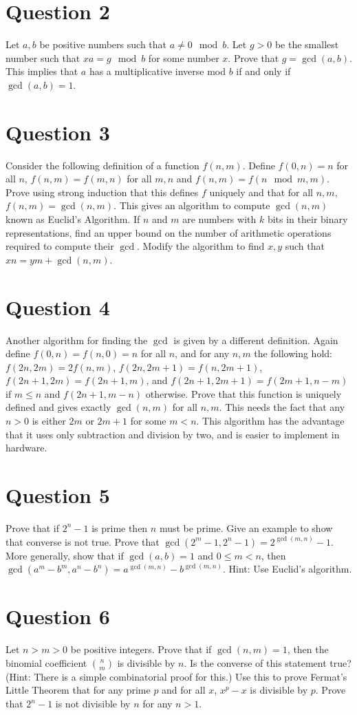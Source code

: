 \documentclass[12pt]{report}
\begin{document}
\section*{Question 2}
Let $a, b$ be positive numbers such that $a \neq 0 \mod b$. Let $g > 0$ be the smallest number such that $xa = g \mod b$ for some number $x$. Prove that $g = \gcd(a, b)$. This implies that $a$ has a multiplicative inverse mod $b$ if and only if $\gcd(a, b) = 1$.
\section*{Question 3}
Consider the following definition of a function $f(n, m)$. Define $f(0, n) = n$ for all $n$, $f(n, m) = f(m, n)$ for all $m, n$ and $f(n, m) = f(n \mod m, m)$. Prove using strong induction that this defines $f$ uniquely and that for all $n, m$, $f(n, m) = \gcd(n, m)$. This gives an algorithm to compute $\gcd(n, m)$ known as Euclid's Algorithm. If $n$ and $m$ are numbers with $k$ bits in their binary representations, find an upper bound on the number of arithmetic operations required to compute their $\gcd$. Modify the algorithm to find $x, y$ such that $xn = ym + \gcd(n, m)$.
\section*{Question 4}
Another algorithm for finding the $\gcd$ is given by a different definition. Again define $f(0, n) = f(n, 0) = n$ for all $n$, and for any $n, m$ the following hold: $f(2n, 2m) = 2f(n, m)$, $f(2n, 2m + 1) = f(n, 2m + 1)$, $f(2n + 1, 2m) = f(2n + 1, m)$, and $f(2n + 1, 2m + 1) = f(2m + 1, n - m)$ if $m \leq n$ and $f(2n + 1, m - n)$ otherwise. Prove that this function is uniquely defined and gives exactly $\gcd(n, m)$ for all $n, m$. This needs the fact that any $n > 0$ is either $2m$ or $2m + 1$ for some $m < n$. This algorithm has the advantage that it uses only subtraction and division by two, and is easier to implement in hardware.
\section*{Question 5}
Prove that if $2^{n} - 1$ is prime then $n$ must be prime. Give an example to show that converse is not true. Prove that $\gcd(2^{m} - 1, 2^{n} - 1) = 2^{\gcd(m, n)} - 1$. More generally, show that if $\gcd(a, b) = 1$ and $0 \leq m < n$, then $\gcd(a^m - b^m, a^n - b^n) = a^{\gcd(m, n)} - b^{\gcd(m, n)}$. Hint: Use Euclid's algorithm.
\section*{Question 6}
Let $n > m > 0$ be positive integers. Prove that if $\gcd(n, m) = 1$, then the binomial coefficient $\binom{n}{m}$ is divisible by $n$. Is the converse of this statement true? (Hint: There is a simple combinatorial proof for this.) Use this to prove Fermat's Little Theorem that for any prime $p$ and for all $x$, $x^{p} - x$ is divisible by $p$. Prove that $2^n - 1$ is not divisible by $n$ for any $n > 1$.
\end{document}
